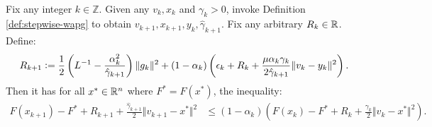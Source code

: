 \documentclass[12pt]{article}
\begin{document}
    \begin{proposition}\label{prop:stepwise-lyapunov}\;\\
        Fix any integer $k \in \mathbb Z$.
        Given any $v_k, x_k$ and $\gamma_k > 0$, invoke Definition \ref{def:stepwise-wapg} to obtain $v_{k + 1}, x_{k + 1}, y_k, \hat \gamma_{k + 1}$. 
        Fix any arbitrary $R_k \in \mathbb R$.
        Define: 
        \begin{align*}
            R_{k + 1}
            \vcentcolon=
            \frac{1}{2}\left(
                L^{-1} - \frac{\alpha_k^2}{\hat \gamma_{k + 1}}
            \right)\Vert g_k\Vert^2
            + 
            (1 - \alpha_k)
            \left(
                \epsilon_k + R_k + 
                \frac{\mu\alpha_k\gamma_k}{2\hat \gamma_{k + 1}}
                \Vert v_k - y_k\Vert^2
            \right). 
        \end{align*}
        Then it has for all $x^* \in \mathbb R^n$ where $F^* = F(x^*)$, the inequality: 
        \begin{align*}
            F(x_{k + 1}) - F^* + R_{k + 1} + \frac{\hat \gamma_{k + 1}}{2}\Vert v_{k + 1} - x^*\Vert^2
            &\le 
            (1 - \alpha_k)
            \left(
                F(x_k) - F^* + R_k + \frac{\gamma_{k}}{2}\Vert v_k - x^*\Vert^2
            \right). 
        \end{align*}
    \end{proposition}
\end{document}

